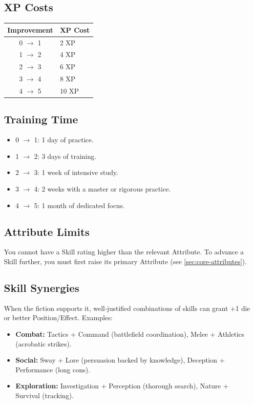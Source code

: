 \subsection{XP Costs}
\begin{center}
\begin{tabular}{cl}
\toprule
\textbf{Improvement} & \textbf{XP Cost} \\
\midrule
0 $\rightarrow$ 1 & 2 XP \\
1 $\rightarrow$ 2 & 4 XP \\
2 $\rightarrow$ 3 & 6 XP \\
3 $\rightarrow$ 4 & 8 XP \\
4 $\rightarrow$ 5 & 10 XP \\
\bottomrule
\end{tabular}
\end{center}

\subsection{Training Time}
\label{sec:skill-training-time}
\begin{itemize}
  \item 0 $\rightarrow$ 1: 1 day of practice.
  \item 1 $\rightarrow$ 2: 3 days of training.
  \item 2 $\rightarrow$ 3: 1 week of intensive study.
  \item 3 $\rightarrow$ 4: 2 weeks with a master or rigorous practice.
  \item 4 $\rightarrow$ 5: 1 month of dedicated focus.
\end{itemize}

\subsection{Attribute Limits}
\label{sec:attribute-limits}
You cannot have a Skill rating higher than the relevant Attribute. To advance
a Skill further, you must first raise its primary Attribute (see \ref{sec:core-attributes}).

\subsection{Skill Synergies}
\label{sec:skill-synergies}
When the fiction supports it, well‑justified combinations of skills can grant
+1 die or better Position/Effect. Examples:
\begin{itemize}
  \item \textbf{Combat:} Tactics + Command (battlefield coordination), Melee + Athletics (acrobatic strikes).
  \item \textbf{Social:} Sway + Lore (persuasion backed by knowledge), Deception + Performance (long cons).
  \item \textbf{Exploration:} Investigation + Perception (thorough search), Nature + Survival (tracking).
\end{itemize}

